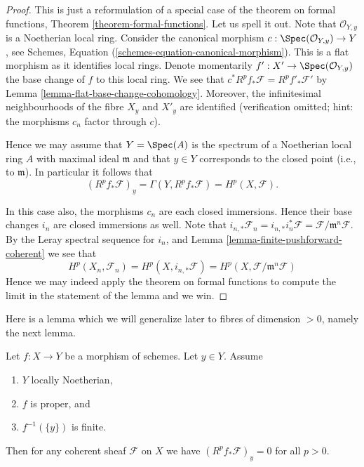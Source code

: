 \begin{proof}
This is just a reformulation of a special case of the theorem
on formal functions, Theorem \ref{theorem-formal-functions}.
Let us spell it out. Note that $\mathcal{O}_{Y, y}$ is a Noetherian
local ring. Consider the canonical morphism
$c : \Spec(\mathcal{O}_{Y, y}) \to Y$, see
Schemes, Equation (\ref{schemes-equation-canonical-morphism}).
This is a flat morphism as it identifies local rings.
Denote momentarily $f' : X' \to \Spec(\mathcal{O}_{Y, y})$
the base change of $f$ to this local ring. We see that
$c^*R^pf_*\mathcal{F} = R^pf'_*\mathcal{F}'$ by
Lemma \ref{lemma-flat-base-change-cohomology}.
Moreover, the infinitesimal neighbourhoods of
the fibre $X_y$ and $X'_y$ are identified (verification omitted; hint:
the morphisms $c_n$ factor through $c$).

\medskip\noindent
Hence we may assume that $Y = \Spec(A)$ is the spectrum of
a Noetherian local ring $A$ with maximal ideal $\mathfrak m$
and that $y \in Y$ corresponds to the closed point (i.e., to $\mathfrak m$).
In particular it follows that
$$
\left(R^pf_*\mathcal{F}\right)_y =
\Gamma(Y, R^pf_*\mathcal{F}) =
H^p(X, \mathcal{F}).
$$

\medskip\noindent
In this case also, the morphisms $c_n$ are each closed immersions.
Hence their base changes $i_n$ are closed immersions as well.
Note that $i_{n, *}\mathcal{F}_n = i_{n, *}i_n^*\mathcal{F}
= \mathcal{F}/\mathfrak m^n\mathcal{F}$. By the Leray spectral sequence
for $i_n$, and Lemma \ref{lemma-finite-pushforward-coherent} we see that
$$
H^p(X_n, \mathcal{F}_n) =
H^p(X, i_{n, *}\mathcal{F}) =
H^p(X, \mathcal{F}/\mathfrak m^n\mathcal{F})
$$
Hence we may indeed apply the theorem on formal functions to compute
the limit in the statement of the lemma and we win.
\end{proof}

\noindent
Here is a lemma which we will generalize later to fibres of
dimension $ > 0$, namely the next lemma.

\begin{lemma}
\label{lemma-higher-direct-images-zero-finite-fibre}
Let $f : X \to Y$ be a morphism of schemes.
Let $y \in Y$.
Assume
\begin{enumerate}
\item $Y$ locally Noetherian,
\item $f$ is proper, and
\item $f^{-1}(\{y\})$ is finite.
\end{enumerate}
Then for any coherent sheaf $\mathcal{F}$ on $X$ we have
$(R^pf_*\mathcal{F})_y = 0$ for all $p > 0$.
\end{lemma}

